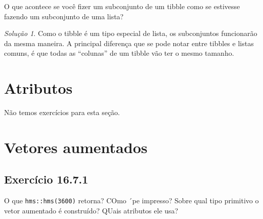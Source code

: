 \documentclass[
]{latex/krantz}
\theoremstyle{definition}
\theoremstyle{definition}
\theoremstyle{definition}
\theoremstyle{definition}
\theoremstyle{remark}
\newtheorem*{solution}{Solução}
\begin{document}
O que acontece se você fizer um subconjunto de um tibble como se estivesse fazendo um subconjunto de uma lista?

\begin{solution}
Como o tibble é um tipo especial de lista, os subconjuntos funcionarão da mesma maneira. A principal diferença que se pode notar entre tibbles e listas comuns, é que todas as ``colunas'' de um tibble vão ter o mesmo tamanho.
\end{solution}

\hypertarget{atributos}{%
\section{Atributos}\label{atributos}}

Não temos exercícios para esta seção.

\hypertarget{vetores-aumentados}{%
\section{Vetores aumentados}\label{vetores-aumentados}}

\hypertarget{exr16-7-1}{%
\subsection*{Exercício 16.7.1}\label{exr16-7-1}}

O que \texttt{hms::hms(3600)} retorna? COmo ´pe impresso? Sobre qual tipo primitivo o vetor aumentado é construído? QUais atributos ele usa?
\end{document}
